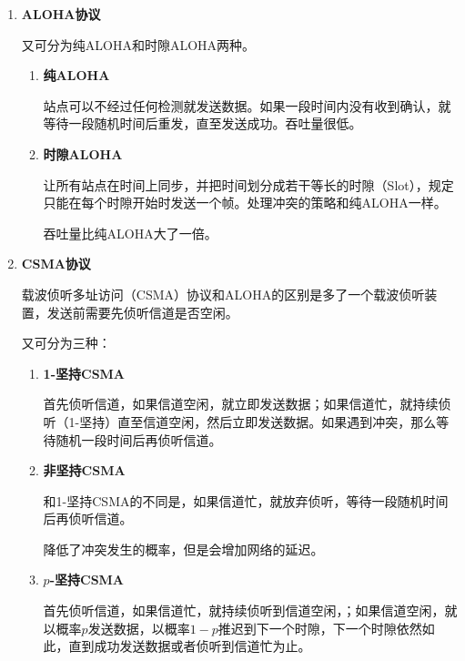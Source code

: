\documentclass[12pt, a4paper, oneside]{ctexart}
\begin{document}
\begin{enumerate}
    \item {\bf ALOHA协议}
    
    又可分为纯ALOHA和时隙ALOHA两种。
    \begin{enumerate}
        \item {\bf 纯ALOHA}
        
        站点可以不经过任何检测就发送数据。如果一段时间内没有收到确认，就等待一段随机时间后重发，直至发送成功。吞吐量很低。
        \item {\bf 时隙ALOHA}
        
        让所有站点在时间上同步，并把时间划分成若干等长的时隙（Slot），规定只能在每个时隙开始时发送一个帧。处理冲突的策略和纯ALOHA一样。

        吞吐量比纯ALOHA大了一倍。

    \end{enumerate}
    \item {\bf CSMA协议}
    
    载波侦听多址访问（CSMA）协议和ALOHA的区别是多了一个载波侦听装置，发送前需要先侦听信道是否空闲。

    又可分为三种：
    \begin{enumerate}
        \item {\bf 1-坚持CSMA}
        
        首先侦听信道，如果信道空闲，就立即发送数据；如果信道忙，就持续侦听（1-坚持）直至信道空闲，然后立即发送数据。如果遇到冲突，那么等待随机一段时间后再侦听信道。

        \item {\bf 非坚持CSMA}
        
        和1-坚持CSMA的不同是，如果信道忙，就放弃侦听，等待一段随机时间后再侦听信道。

        降低了冲突发生的概率，但是会增加网络的延迟。

        \item {\bf $p$-坚持CSMA}
        
        首先侦听信道，如果信道忙，就持续侦听到信道空闲，；如果信道空闲，就以概率$p$发送数据，以概率$1-p$推迟到下一个时隙，下一个时隙依然如此，直到成功发送数据或者侦听到信道忙为止。

        \begin{table}[h]
            \centering
            \caption{三种不同类型的CSMA协议的比较}
        \end{table}
    \end{enumerate}


\end{enumerate}
\end{document}
